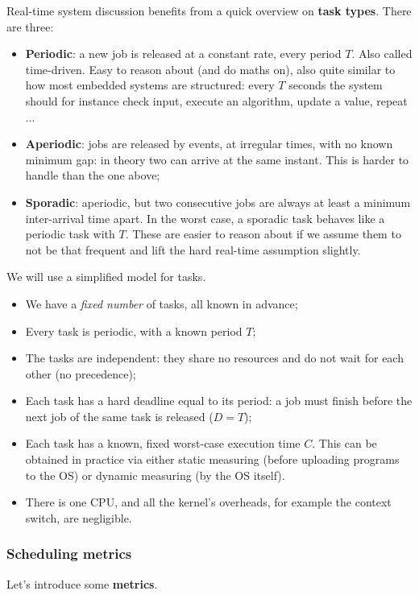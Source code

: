 \documentclass[a4paper,11pt]{article}
\begin{document}
Real-time system discussion benefits from a quick overview on \textbf{task types}.
There are three:
\begin{itemize}
	\item \textbf{Periodic}: a new job is released at a constant rate, every period $T$. Also called time-driven. Easy to reason about (and do maths on), also quite similar to how most embedded systems are structured: every $T$ seconds the system should for instance check input, execute an algorithm, update a value, repeat ...
	\item \textbf{Aperiodic}: jobs are released by events, at irregular times, with no known minimum gap: in theory two can arrive at the same instant. This is harder to handle than the one above;
	\item \textbf{Sporadic}: aperiodic, but two consecutive jobs are always at least a minimum inter-arrival time apart. In the worst case, a sporadic task behaves like a periodic task with $T$. These are easier to reason about if we assume them to not be that frequent and lift the hard real-time assumption slightly.
\end{itemize}

We will use a simplified model for tasks.
\begin{itemize}
	\item We have a \textit{fixed number} of tasks, all known in advance;
	\item Every task is periodic, with a known period $T$;
	\item The tasks are independent: they share no resources and do not wait for each other (no precedence);
	\item Each task has a hard deadline equal to its period: a job must finish before the next job of the same task is released ($D = T$);
	\item Each task has a known, fixed worst-case execution time $C$. This can be obtained in practice via either static measuring (before uploading programs to the OS) or dynamic measuring (by the OS itself).
	\item There is one CPU, and all the kernel's overheads, for example the context switch, are negligible.
\end{itemize}

\subsubsection{Scheduling metrics}

Let's introduce some \textbf{metrics}.
\end{document}
